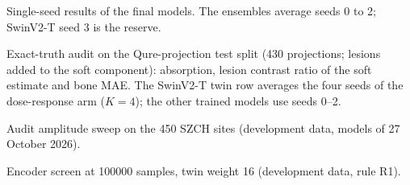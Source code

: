 \begin{table}[htbp]
\centering\small
\caption{Single-seed results of the final models. The ensembles average seeds 0 to 2; SwinV2-T seed 3 is the reserve.}
\label{tab:app_seeds}
\end{table}
\begin{table}[htbp]
\centering\small
\caption{Exact-truth audit on the Qure-projection test split (430 projections; lesions added to the soft component): absorption, lesion contrast ratio of the soft estimate and bone MAE. The SwinV2-T twin row averages the four seeds of the dose-response arm ($K=4$); the other trained models use seeds 0--2.}
\label{tab:app_qp}
\end{table}
\begin{table}[htbp]
\centering\small
\caption{Audit amplitude sweep on the 450 SZCH sites (development data, models of 27 October 2026).}
\label{tab:app_amplitude}
\end{table}
\begin{table}[htbp]
\centering\small
\caption{Encoder screen at \num{100000} samples, twin weight 16 (development data, rule R1).}
\label{tab:app_screen}
\end{table}
